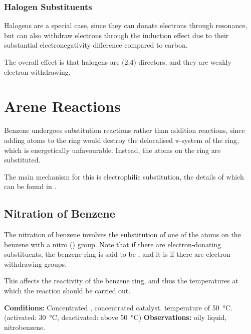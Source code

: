 
			\subsubsection{Halogen Substituents}

				Halogens are a special case, since they can donate electrons through resonance, but can also withdraw electrons through
				the induction effect due to their substantial electronegativity difference compared to carbon.

				The overall effect is that halogens are  (2,4) directors, and they are weakly electron-withdrawing.





	\pagebreak
	\hypertarget{AreneReactions}{}
	\section{Arene Reactions}

		Benzene undergoes substitution reactions rather than addition reactions, since adding atoms to the ring would destroy the
		delocalised $\pi$-system of the ring, which is energetically unfavourable. Instead, the  atoms on the ring are substituted.

		The main mechanism for this is electrophilic substitution, the details of which can be found in
		\hyperlink{AppendixElectrophilicSubstitution}{}.


		\subsection{Nitration of Benzene}

			The nitration of benzene involves the substitution of one of the  atoms on the benzene with a nitro () group.
			Note that if there are electron-donating substituents, the benzene ring is said to be , and it is 
			if there are electron-withdrawing groups.

			This affects the reactivity of the benzene ring, and thus the temperatures at which the reaction should be carried out.

			\vspace{1.5em}
			\vbox{\textbf{Conditions:}	\tabto{35mm}Concentrated , concentrated  catalyst.
										\tabto{35mm} temperature of \SI{50}{\celsius}.
													(activated: \SI{30}{\celsius}, deactivated: above \SI{50}{\celsius})}
			\vspace{0.75em}
			\vbox{\textbf{Observations:}\tabto{35mm} oily liquid, nitrobenzene.}

